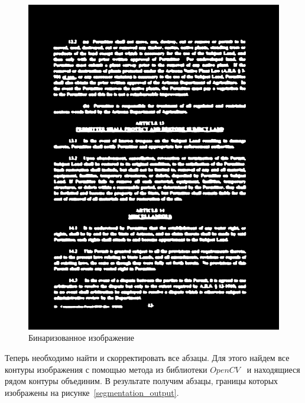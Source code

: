 \begin{figure}
    \includegraphics[scale=0.2]{img/paragraph/thresh.png}
    \caption{Бинаризованное изображение}
    \label{segmentation_threshold}
\end{figure}

Теперь необходимо найти и скорректировать все абзацы. Для этого найдем все контуры изображения с помощью метода из библиотеки $OpenCV$~\cite{opencv_contours} и находящиеся рядом контуры объединим.
В результате получим абзацы, границы которых изображены на рисунке~\ref{segmentation_output}.

